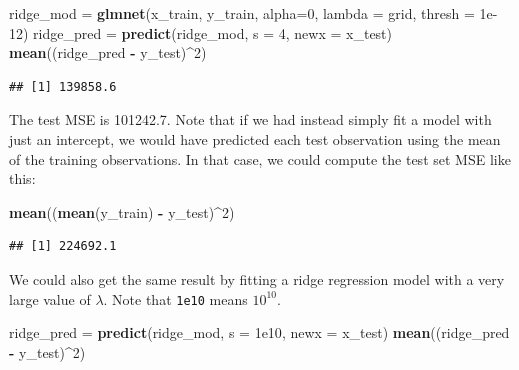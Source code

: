 \documentclass[
  openany]{book}
\newenvironment{Shaded}{\begin{snugshade}}{\end{snugshade}}
\newcommand{\DataTypeTok}[1]{\textcolor[rgb]{0.13,0.29,0.53}{#1}}
\newcommand{\DecValTok}[1]{\textcolor[rgb]{0.00,0.00,0.81}{#1}}
\newcommand{\FloatTok}[1]{\textcolor[rgb]{0.00,0.00,0.81}{#1}}
\newcommand{\KeywordTok}[1]{\textcolor[rgb]{0.13,0.29,0.53}{\textbf{#1}}}
\newcommand{\NormalTok}[1]{#1}
\newcommand{\OperatorTok}[1]{\textcolor[rgb]{0.81,0.36,0.00}{\textbf{#1}}}
\newcommand{\StringTok}[1]{\textcolor[rgb]{0.31,0.60,0.02}{#1}}
\begin{document}
\begin{Shaded}
\begin{Highlighting}[]
\NormalTok{ridge_mod =}\StringTok{ }\KeywordTok{glmnet}\NormalTok{(x_train, y_train, }\DataTypeTok{alpha=}\DecValTok{0}\NormalTok{, }\DataTypeTok{lambda =}\NormalTok{ grid, }\DataTypeTok{thresh =} \FloatTok{1e-12}\NormalTok{)}
\NormalTok{ridge_pred =}\StringTok{ }\KeywordTok{predict}\NormalTok{(ridge_mod, }\DataTypeTok{s =} \DecValTok{4}\NormalTok{, }\DataTypeTok{newx =}\NormalTok{ x_test)}
\KeywordTok{mean}\NormalTok{((ridge_pred }\OperatorTok{-}\StringTok{ }\NormalTok{y_test)}\OperatorTok{^}\DecValTok{2}\NormalTok{)}
\end{Highlighting}
\end{Shaded}

\begin{verbatim}
## [1] 139858.6
\end{verbatim}

The test MSE is 101242.7. Note that if we had instead simply fit a model
with just an intercept, we would have predicted each test observation using
the mean of the training observations. In that case, we could compute the
test set MSE like this:

\begin{Shaded}
\begin{Highlighting}[]
\KeywordTok{mean}\NormalTok{((}\KeywordTok{mean}\NormalTok{(y_train) }\OperatorTok{-}\StringTok{ }\NormalTok{y_test)}\OperatorTok{^}\DecValTok{2}\NormalTok{)}
\end{Highlighting}
\end{Shaded}

\begin{verbatim}
## [1] 224692.1
\end{verbatim}

We could also get the same result by fitting a ridge regression model with
a very large value of \(\lambda\). Note that \texttt{1e10} means \(10^{10}\).

\begin{Shaded}
\begin{Highlighting}[]
\NormalTok{ridge_pred =}\StringTok{ }\KeywordTok{predict}\NormalTok{(ridge_mod, }\DataTypeTok{s =} \FloatTok{1e10}\NormalTok{, }\DataTypeTok{newx =}\NormalTok{ x_test)}
\KeywordTok{mean}\NormalTok{((ridge_pred }\OperatorTok{-}\StringTok{ }\NormalTok{y_test)}\OperatorTok{^}\DecValTok{2}\NormalTok{)}
\end{Highlighting}
\end{Shaded}
\end{document}
